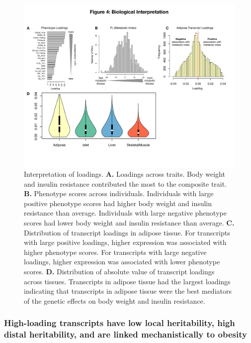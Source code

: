 \documentclass[
]{article}
\begin{document}
\begin{figure}[ht!]
\includegraphics[width=\textwidth]{Figures/Fig4_interpretation.pdf} 
\caption{Interpretation of loadings. \textbf{A.} Loadings 
across traits. Body weight and insulin resistance contributed 
the most to the composite trait. \textbf{B.} Phenotype scores 
across individuals. Individuals with large positive phenotype 
scores had higher body weight and insulin resistance than average. 
Individuals with large negative phenotype scores had lower body 
weight and insulin resistance than average. \textbf{C.} 
Distribution of transcript loadings in adipose tissue. For 
transcripts with large positive loadings, higher expression was 
associated with higher phenotype scores. For transcripts with 
large negative loadings, higher expression was associated with 
lower phenotype scores. \textbf{D.} Distribution of absolute 
value of transcript loadings across tissues. Transcripts in 
adipose tissue had the largest loadings indicating that 
transcripts in adipose tissue were the best mediators of the 
genetic effects on body weight and insulin resistance.
}
\label{fig:interpretation}
\end{figure}

\subsubsection{High-loading transcripts have low local heritability,
high distal heritability, and are linked mechanistically to
obesity}\label{high-loading-transcripts-have-low-local-heritability-high-distal-heritability-and-are-linked-mechanistically-to-obesity}
\end{document}
